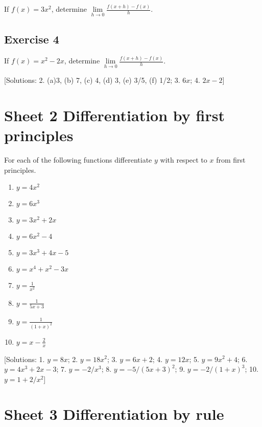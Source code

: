 \documentclass[
  11pt,
  oneside]{book}
\providecommand{\tightlist}{%
  \setlength{\itemsep}{0pt}\setlength{\parskip}{0pt}}
\newcommand{\slide}{}
\theoremstyle{definition}
\theoremstyle{definition}
\theoremstyle{definition}
\theoremstyle{definition}
\theoremstyle{remark}
\begin{document}
If \(f(x) = 3x^2\), determine \(\lim\limits_{h\to 0}\frac{f(x+h)-f(x)}{h}\).

\slide

\subsection*{Exercise 4}\label{exercise-4}

If \(f(x) = x^2-2x\), determine \(\lim\limits_{h\to 0}\frac{f(x+h)-f(x)}{h}\).
\slide

{[}Solutions: 2. (a)3, (b) 7, (c) 4, (d) 3, (e) 3/5, (f) 1/2; 3. \(6x\); 4. \(2x-2\){]}
\slide

\section{Sheet 2 Differentiation by first principles}\label{sheet-2-differentiation-by-first-principles}

For each of the following functions differentiate \(y\) with respect to \(x\) from first principles.

\begin{enumerate}
\def\labelenumi{\arabic{enumi}.}
\tightlist
\item
  \(y=4x^2\)
\item
  \(y=6x^3\)
\item
  \(y=3x^2+2x\)
\item
  \(y=6x^2-4\)
\item
  \(y=3x^3+4x-5\)
\item
  \(y=x^4+x^2-3x\)
\item
  \(y=\frac{1}{x^2}\)
\item
  \(y=\frac{1}{5x+3}\)
\item
  \(y=\frac{1}{(1+x)^2}\)
\item
  \(y=x-\frac{2}{x}\)
\end{enumerate}

\slide

{[}Solutions: 1. \(y=8x\); 2. \(y=18x^2\); 3. \(y=6x+2\); 4. \(y=12x\); 5. \(y=9x^2+4\); 6. \(y=4x^3+2x-3\); 7. \(y=-2/x^3\); 8. \(y=-5/(5x+3)^2\); 9. \(y=-2/(1+x)^3\); 10. \(y=1+2/x^2\){]}

\slide

\section{Sheet 3 Differentiation by rule}\label{sheet-3-differentiation-by-rule}
\end{document}
